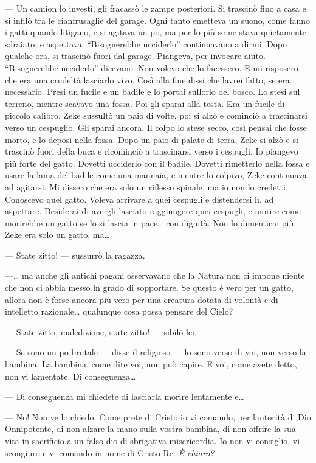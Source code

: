 --- Un camion lo investì, gli fracassò le zampe posteriori. Si trascinò
fino a casa e si infilò tra le cianfrusaglie del garage. Ogni tanto
emetteva un suono, come fanno i gatti quando litigano, e si agitava un
po\textquotesingle, ma per lo più se ne stava quietamente sdraiato, e
aspettava. ``Bisognerebbe ucciderlo'' continuavano a dirmi. Dopo qualche
ora, si trascinò fuori dal garage. Piangeva, per invocare aiuto.
``Bisognerebbe ucciderlo'' dicevano. Non volevo che lo facessero. E mi
risposero che era una crudeltà lasciarlo vivo. Così alla fine dissi che
l\textquotesingle avrei fatto, se era necessario. Presi un fucile e un
badile e lo portai sull\textquotesingle orlo del bosco. Lo stesi sul
terreno, mentre scavavo una fossa. Poi gli sparai alla testa. Era un
fucile di piccolo calibro. Zeke sussultò un paio di volte, poi si alzò e
cominciò a trascinarsi verso un cespuglio. Gli sparai ancora. Il colpo
lo stese secco, così pensai che fosse morto, e lo deposi nella fossa.
Dopo un paio di palate di terra, Zeke si alzò e si trascinò fuori della
buca e ricominciò a trascinarsi verso i cespugli. Io piangevo più forte
del gatto. Dovetti ucciderlo con il badile. Dovetti rimetterlo nella
fossa e usare la lama del badile come una mannaia, e mentre lo colpivo,
Zeke continuava ad agitarsi. Mi dissero che era solo un riflesso
spinale, ma io non lo credetti. Conoscevo quel gatto. Voleva arrivare a
quei cespugli e distendersi lì, ad aspettare. Desiderai di avergli
lasciato raggiungere quei cespugli, e morire come morirebbe un gatto se
lo si lascia in pace\ldots{} con dignità. Non lo dimenticai più. Zeke
era solo un gatto, ma\ldots{}

--- State zitto! --- sussurrò la ragazza.

---\ldots{} ma anche gli antichi pagani osservavano che la Natura non ci
impone niente che non ci abbia messo in grado di sopportare. Se questo è
vero per un gatto, allora non è forse ancora più vero per una creatura
dotata di volontà e di intelletto razionale\ldots{} qualunque cosa possa
pensare del Cielo?

--- State zitto, maledizione, state zitto! --- sibilò lei.

--- Se sono un po\textquotesingle{} brutale --- disse il religioso ---
lo sono verso di voi, non verso la bambina. La bambina, come dite voi,
non può capire. E voi, come avete detto, non vi lamentate. Di
conseguenza\ldots{}

--- Di conseguenza mi chiedete di lasciarla morire lentamente e\ldots{}

--- No! Non ve lo chiedo. Come prete di Cristo io vi comando, per
l\textquotesingle autorità di Dio Onnipotente, di non alzare la mano
sulla vostra bambina, di non offrire la sua vita in sacrificio a un
falso dio di sbrigativa misericordia. Io non vi consiglio, vi scongiuro
e vi comando in nome di Cristo Re. \emph{È chiaro?}

